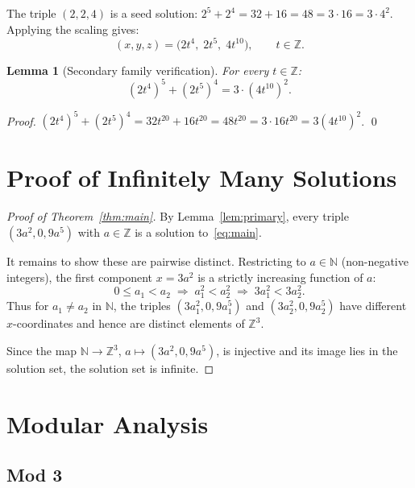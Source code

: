 \documentclass[12pt,a4paper]{article}
\newtheorem{lemma}[theorem]{Lemma}
\theoremstyle{definition}
\newcommand{\Z}{\mathbb{Z}}
\newcommand{\N}{\mathbb{N}}
\begin{document}
\medskip
The triple $(2, 2, 4)$ is a seed solution: $2^5 + 2^4 = 32 + 16 = 48 = 3 \cdot 16 = 3 \cdot 4^2$. Applying the scaling gives:
\begin{equation}\label{eq:family2}
  (x, y, z) = \bigl(2t^4,\; 2t^5,\; 4t^{10}\bigr), \qquad t \in \Z.
\end{equation}

\begin{lemma}[Secondary family verification]\label{lem:secondary}
  For every $t \in \Z$:
  \[
    (2t^4)^5 + (2t^5)^4 = 3 \cdot (4t^{10})^2.
  \]
\end{lemma}
\begin{proof}
  $(2t^4)^5 + (2t^5)^4 = 32t^{20} + 16t^{20} = 48t^{20} = 3 \cdot 16 t^{20} = 3(4t^{10})^2$. \qed
\end{proof}

\section{Proof of Infinitely Many Solutions}\label{sec:proof}

\begin{proof}[Proof of Theorem~\ref{thm:main}]
  By Lemma~\ref{lem:primary}, every triple $(3a^2, 0, 9a^5)$ with $a \in \Z$ is a solution to~\eqref{eq:main}.

  It remains to show these are pairwise distinct.  Restricting to $a \in \N$
  (non-negative integers), the first component $x = 3a^2$ is a strictly
  increasing function of $a$:
  \[
    0 \leq a_1 < a_2 \;\Longrightarrow\; a_1^2 < a_2^2 \;\Longrightarrow\; 3a_1^2 < 3a_2^2.
  \]
  Thus for $a_1 \neq a_2$ in $\N$, the triples $(3a_1^2, 0, 9a_1^5)$ and $(3a_2^2, 0, 9a_2^5)$ have different $x$-coordinates and hence are distinct elements of $\Z^3$.

  Since the map $\N \to \Z^3$, $a \mapsto (3a^2, 0, 9a^5)$, is injective and its image lies in the solution set, the solution set is infinite.
\end{proof}

\section{Modular Analysis}\label{sec:modular}

\subsection{Mod 3}
\end{document}
